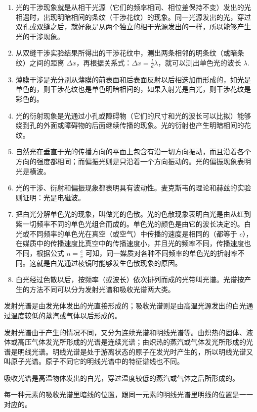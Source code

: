 \begin{enumerate}
\item
  光的干涉现象就是从相干光源（它们的频率相同、相位差保持不变）发出的光相遇时，出现明暗相间的条纹（干涉花纹）的现象。同一光源发出的光，穿过双孔或双缝之后，就好象是从两个独立的相干光源发出的一样，所以能够产生光的干涉现象。
\item
  从双缝干涉实验结果所得出的干涉花纹中，测出两条相邻的明条纹（或暗条纹）之间的距离
  \(\Delta x\)，再根据关系式：\(\Delta x = \frac{l}{d} \lambda\)，就可以测出单色光的波长
  \(\lambda\).
\item
  薄膜干涉是光分别从薄膜的前表面和后表面反射以后相迭加而形成的，如光是单色的，则干涉花纹也是单色明暗相间的，如果入射光是白光，则干涉花纹是彩色的。
\item
  光的衍射现象是光通过小孔或障碍物（它们的尺寸和光的波长可以比拟）能够绕到孔的外面或障碍物的后面继续传播的现象。光的衍射也产生明暗相间的花纹。
\item
  自然光在垂直于光的传播方向的平面上包含有沿一切方向振动，而且沿着各个方向的强度都相同；而偏振光则是只沿着一个方向振动的。光的偏振现象表明光是横波。
\item
  光的干涉、衍射和偏振现象都表明具有波动性。麦克斯韦的理论和赫兹的实验则证明：光是电磁波。
\item
  把白光分解单色光的现象，叫做光的色散。光的色散现象表明白光是由从红到紫一切频率不同的单色光组合而成的。单色光的颜色是由它的波长决定的。白光或不同频率的单色光在真空（或空气）中传播的速度是相同的（都等于
  \(c\)），在媒质中的传播速度比真空中的传播速度小，并且光的频率不同，传播速度也不同，根据公式
  \(n=\frac{c}{v}\)
  可知，同一媒质对各种不同频率的单色光的折射率不同。这就是白光通过棱镜时能够发生色散现象的原因。
\item
  白光经过色散以后，按频率（或波长）依次排列而成的光带叫光谱。光谱按产生的方法不同可以分为发射光谱和吸收光谱两大类。
\end{enumerate}

发射光谱是由发光体发出的光直接形成的；吸收光谱则是由高温光源发出的白光通过温度较低的蒸汽或气体以后形成的。

发射光谱由于产生的情况不同，又分为连续光谱和明线光谱等。由炽热的固体、液体或高压气体发光所形成的光谱是连续光谱；由炽热的蒸汽或气体发光所形成的光谱是明线光谱。明线光谱是处于游离状态的原子在发光时产生的，所以明线光谱又叫原子光谱。原子不同它的明线光谱中的特征谱线也不同。

吸收光谱是高温物体发出的白光，穿过温度较低的蒸汽或气体之后所形成的。

每一种元素的吸收光谱里暗线的位置，跟同一元素的明线光谱里明线的位置是一一对应的。

